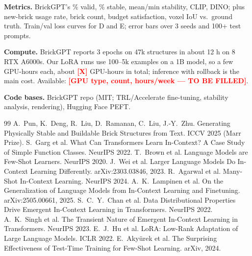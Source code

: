 \documentclass[12pt]{article}
\newcommand{\todo}[1]{\textcolor{red}{\textbf{#1}}}
\begin{document}
\textbf{Metrics.} BrickGPT's \% valid, \% stable, mean/min stability, CLIP, DINO; plus new-brick usage rate, brick count, budget satisfaction, voxel IoU vs.\ ground truth. Train/val loss curves for D and E; error bars over 3 seeds and 100+ test prompts.

\textbf{Compute.} BrickGPT reports 3 epochs on 47k structures in about 12 h on 8 RTX A6000s. Our LoRA runs use 100--5k examples on a 1B model, so a few GPU-hours each, about \todo{[X]} GPU-hours in total; inference with rollback is the main cost. Available: \todo{[GPU type, count, hours/week --- TO BE FILLED]}.

\textbf{Code bases.} BrickGPT repo (MIT; TRL/Accelerate fine-tuning, stability analysis, rendering), Hugging Face PEFT.

\begin{thebibliography}{99}\setlength{\itemsep}{-3pt}\footnotesize
{} A.~Pun, K.~Deng, R.~Liu, D.~Ramanan, C.~Liu, J.-Y.~Zhu. Generating Physically Stable and Buildable Brick Structures from Text. ICCV 2025 (Marr Prize).
 S.~Garg et al. What Can Transformers Learn In-Context? A Case Study of Simple Function Classes. NeurIPS 2022.
 T.~Brown et al. Language Models are Few-Shot Learners. NeurIPS 2020.
 J.~Wei et al. Larger Language Models Do In-Context Learning Differently. arXiv:2303.03846, 2023.
 R.~Agarwal et al. Many-Shot In-Context Learning. NeurIPS 2024.
 A.~K.~Lampinen et al. On the Generalization of Language Models from In-Context Learning and Finetuning. arXiv:2505.00661, 2025.
 S.~C.~Y.~Chan et al. Data Distributional Properties Drive Emergent In-Context Learning in Transformers. NeurIPS 2022.
 A.~K.~Singh et al. The Transient Nature of Emergent In-Context Learning in Transformers. NeurIPS 2023.
 E.~J.~Hu et al. LoRA: Low-Rank Adaptation of Large Language Models. ICLR 2022.
 E.~Aky\"urek et al. The Surprising Effectiveness of Test-Time Training for Few-Shot Learning. arXiv, 2024.
\end{thebibliography}
\end{document}
